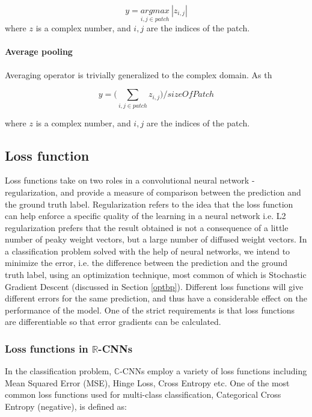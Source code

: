  
\begin{equation}
y = \underset{i,j \in patch}{argmax} \ |z_{i,j}|
\end{equation}
 where $z$ is a complex number, and $i,j$ are the indices of the patch.
\paragraph{Average pooling}
Averaging operator is trivially generalized to the complex domain. As th  
 
 
  \begin{equation}
 y = \bigg(\underset{i,j \in patch}{\sum} z_{i,j} \bigg)/ sizeOfPatch
 \end{equation}
 
 where $z$ is a complex number, and $i,j$ are the indices of the patch.
 
 
 
 \subsection{Loss function}
 Loss functions take on two roles in a convolutional neural network - regularization, and provide a measure of comparison between the prediction and the ground truth label. Regularization refers to the idea that the loss function can help enforce a specific quality of the learning in a neural network i.e. L2 regularization prefers that the result obtained is not a consequence of a little number of peaky weight vectors, but a large number of diffused weight vectors. In a classification problem solved with the help of neural networks, we intend to minimize the error, i.e. the difference between the prediction and the ground truth label, using an optimization technique, most common of which is Stochastic Gradient Descent (discussed in Section \ref{optbp}). Different loss functions will give different errors for the same prediction, and thus have a considerable effect on the performance of the model. One of the strict requirements is that loss functions are differentiable so that error gradients can be calculated.
 
 
 
 \subsubsection{Loss functions in $\mathbb{R}$-CNNs}
 In the classification problem, $\mathbb{C}$-CNNs employ a variety of loss functions including Mean Squared Error (MSE), Hinge Loss, Cross Entropy etc. One of the most common loss functions used for multi-class classification, Categorical Cross Entropy (negative), is defined as:
 
